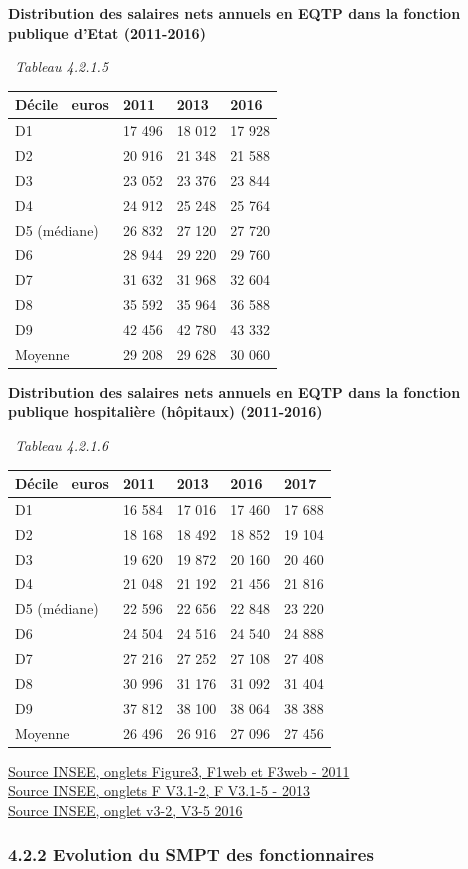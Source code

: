 \textbf{Distribution des salaires nets annuels en EQTP dans la fonction
publique d'Etat (2011-2016)}

~\emph{Tableau 4.2.1.5}

\begin{longtable}[]{@{}llll@{}}
\toprule
Décile ~euros & 2011 & 2013 & 2016\tabularnewline
\midrule
\endhead
D1 & 17 496 & 18 012 & 17 928\tabularnewline
D2 & 20 916 & 21 348 & 21 588\tabularnewline
D3 & 23 052 & 23 376 & 23 844\tabularnewline
D4 & 24 912 & 25 248 & 25 764\tabularnewline
D5 (médiane) & 26 832 & 27 120 & 27 720\tabularnewline
D6 & 28 944 & 29 220 & 29 760\tabularnewline
D7 & 31 632 & 31 968 & 32 604\tabularnewline
D8 & 35 592 & 35 964 & 36 588\tabularnewline
D9 & 42 456 & 42 780 & 43 332\tabularnewline
Moyenne & 29 208 & 29 628 & 30 060\tabularnewline
\bottomrule
\end{longtable}

\textbf{Distribution des salaires nets annuels en EQTP dans la fonction
publique hospitalière (hôpitaux) (2011-2016)}

~\emph{Tableau 4.2.1.6}

\begin{longtable}[]{@{}lllll@{}}
\toprule
Décile ~euros & 2011 & 2013 & 2016 & 2017\tabularnewline
\midrule
\endhead
D1 & 16 584 & 17 016 & 17 460 & 17 688\tabularnewline
D2 & 18 168 & 18 492 & 18 852 & 19 104\tabularnewline
D3 & 19 620 & 19 872 & 20 160 & 20 460\tabularnewline
D4 & 21 048 & 21 192 & 21 456 & 21 816\tabularnewline
D5 (médiane) & 22 596 & 22 656 & 22 848 & 23 220\tabularnewline
D6 & 24 504 & 24 516 & 24 540 & 24 888\tabularnewline
D7 & 27 216 & 27 252 & 27 108 & 27 408\tabularnewline
D8 & 30 996 & 31 176 & 31 092 & 31 404\tabularnewline
D9 & 37 812 & 38 100 & 38 064 & 38 388\tabularnewline
Moyenne & 26 496 & 26 916 & 27 096 & 27 456\tabularnewline
\bottomrule
\end{longtable}

\href{../Docs/ip1486.xls}{Source INSEE, onglets Figure3, F1web et F3web -
2011}\\
\href{../Docs/vue3_remunerations.xls}{Source INSEE, onglets F V3.1-2, F
V3.1-5 - 2013}\\
\href{../Docs/Vue-Remunerations-2018.xlsx}{Source INSEE, onglet v3-2, V3-5
2016}

\hypertarget{evolution-du-smpt-des-fonctionnaires}{%
\subsubsection{4.2.2 Evolution du SMPT des
fonctionnaires}\label{evolution-du-smpt-des-fonctionnaires}}

